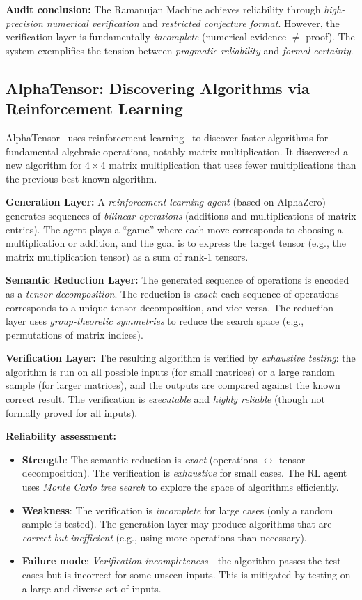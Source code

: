 \documentclass[11pt,a4paper]{article}
\begin{document}
\textbf{Audit conclusion:} The Ramanujan Machine achieves reliability through \emph{high-precision numerical verification} and \emph{restricted conjecture format}. However, the verification layer is fundamentally \emph{incomplete} (numerical evidence $\neq$ proof). The system exemplifies the tension between \emph{pragmatic reliability} and \emph{formal certainty}.

\subsection{AlphaTensor: Discovering Algorithms via Reinforcement Learning}

AlphaTensor~\cite{fawzi2022discovering} uses reinforcement learning~\cite{sutton2018reinforcement} to discover faster algorithms for fundamental algebraic operations, notably matrix multiplication. It discovered a new algorithm for $4 \times 4$ matrix multiplication that uses fewer multiplications than the previous best known algorithm.

\textbf{Generation Layer:} A \emph{reinforcement learning agent} (based on AlphaZero) generates sequences of \emph{bilinear operations} (additions and multiplications of matrix entries). The agent plays a ``game'' where each move corresponds to choosing a multiplication or addition, and the goal is to express the target tensor (e.g., the matrix multiplication tensor) as a sum of rank-1 tensors.

\textbf{Semantic Reduction Layer:} The generated sequence of operations is encoded as a \emph{tensor decomposition}. The reduction is \emph{exact}: each sequence of operations corresponds to a unique tensor decomposition, and vice versa. The reduction layer uses \emph{group-theoretic symmetries} to reduce the search space (e.g., permutations of matrix indices).

\textbf{Verification Layer:} The resulting algorithm is verified by \emph{exhaustive testing}: the algorithm is run on all possible inputs (for small matrices) or a large random sample (for larger matrices), and the outputs are compared against the known correct result. The verification is \emph{executable} and \emph{highly reliable} (though not formally proved for all inputs).

\textbf{Reliability assessment:}
\begin{itemize}
  \item \textbf{Strength}: The semantic reduction is \emph{exact} (operations $\leftrightarrow$ tensor decomposition). The verification is \emph{exhaustive} for small cases. The RL agent uses \emph{Monte Carlo tree search} to explore the space of algorithms efficiently.
  \item \textbf{Weakness}: The verification is \emph{incomplete} for large cases (only a random sample is tested). The generation layer may produce algorithms that are \emph{correct but inefficient} (e.g., using more operations than necessary).
  \item \textbf{Failure mode}: \emph{Verification incompleteness}---the algorithm passes the test cases but is incorrect for some unseen inputs. This is mitigated by testing on a large and diverse set of inputs.
\end{itemize}
\end{document}
